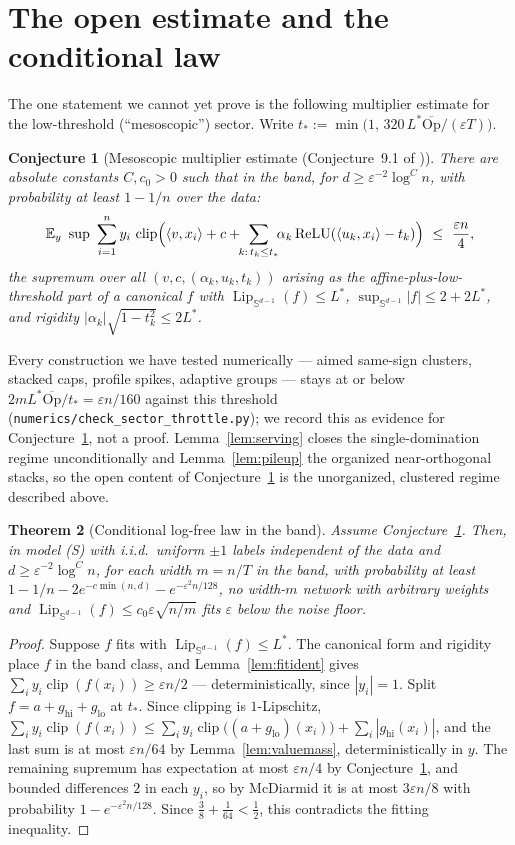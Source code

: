 \documentclass[11pt,reqno]{amsart}
\theoremstyle{plain}
\newtheorem{theorem}{Theorem}[section]
\newtheorem{conjecture}[theorem]{Conjecture}
\theoremstyle{definition}
\theoremstyle{remark}
\newcommand{\Sd}{\mathbb{S}^{d-1}}
\newcommand{\EE}{\mathbb{E}}
\newcommand{\eps}{\varepsilon}
\newcommand{\Lip}{\operatorname{Lip}}
\newcommand{\relu}{\operatorname{ReLU}}
\newcommand{\inn}[2]{\langle #1,#2\rangle}
\DeclareMathOperator{\clip}{clip}
\begin{document}
\section{The open estimate and the conditional law}

The one statement we cannot yet prove is the following multiplier estimate for the low-threshold (``mesoscopic'') sector. Write $t_\ast:=\min\bigl(1,\,320\,L^\ast\overline{\mathrm{Op}}/(\eps T)\bigr)$.

\begin{conjecture}[Mesoscopic multiplier estimate (Conjecture~9.1 of \cite{paper})]\label{conj:M}
There are absolute constants $C,c_0>0$ such that in the band, for $d\ge\eps^{-2}\log^Cn$, with probability at least $1-1/n$ over the data:
\[
\EE_y\ \sup\ \sum_{i=1}^ny_i\,\clip\Bigl(\inn v{x_i}+c+\!\!\sum_{k:\,t_k\le t_\ast}\!\!\alpha_k\relu(\inn{u_k}{x_i}-t_k)\Bigr)\ \le\ \frac{\eps n}4,
\]
the supremum over all $(v,c,(\alpha_k,u_k,t_k))$ arising as the affine-plus-low-threshold part of a canonical $f$ with $\Lip_{\Sd}(f)\le L^\ast$, $\sup_{\Sd}|f|\le2+2L^\ast$, and rigidity $|\alpha_k|\sqrt{1-t_k^2}\le2L^\ast$.
\end{conjecture}

Every construction we have tested numerically --- aimed same-sign clusters, stacked caps, profile spikes, adaptive groups --- stays at or below $2mL^\ast\overline{\mathrm{Op}}/t_\ast=\eps n/160$ against this threshold (\texttt{numerics/check\_sector\_throttle.py}); we record this as evidence for Conjecture~\ref{conj:M}, not a proof. Lemma~\ref{lem:serving} closes the single-domination regime unconditionally and Lemma~\ref{lem:pileup} the organized near-orthogonal stacks, so the open content of Conjecture~\ref{conj:M} is the unorganized, clustered regime described above.

\begin{theorem}[Conditional log-free law in the band]\label{thm:conditional}
Assume Conjecture~\ref{conj:M}. Then, in model (S) with i.i.d.\ uniform $\pm1$ labels independent of the data and $d\ge\eps^{-2}\log^Cn$, for each width $m=n/T$ in the band, with probability at least $1-1/n-2e^{-c\min(n,d)}-e^{-\eps^2n/128}$, no width-$m$ network with arbitrary weights and $\Lip_{\Sd}(f)\le c_0\eps\sqrt{n/m}$ fits $\eps$ below the noise floor.
\end{theorem}
\begin{proof}[Proof]
Suppose $f$ fits with $\Lip_{\Sd}(f)\le L^\ast$. The canonical form and rigidity place $f$ in the band class, and Lemma~\ref{lem:fitident} gives $\sum_iy_i\clip(f(x_i))\ge\eps n/2$ --- deterministically, since $|y_i|=1$. Split $f=a+g_{\mathrm{hi}}+g_{\mathrm{lo}}$ at $t_\ast$. Since clipping is $1$-Lipschitz, $\sum_iy_i\clip(f(x_i))\le\sum_iy_i\clip\bigl((a+g_{\mathrm{lo}})(x_i)\bigr)+\sum_i|g_{\mathrm{hi}}(x_i)|$, and the last sum is at most $\eps n/64$ by Lemma~\ref{lem:valuemass}, deterministically in $y$. The remaining supremum has expectation at most $\eps n/4$ by Conjecture~\ref{conj:M}, and bounded differences $2$ in each $y_i$, so by McDiarmid it is at most $3\eps n/8$ with probability $1-e^{-\eps^2n/128}$. Since $\tfrac38+\tfrac1{64}<\tfrac12$, this contradicts the fitting inequality.
\end{proof}
\end{document}
